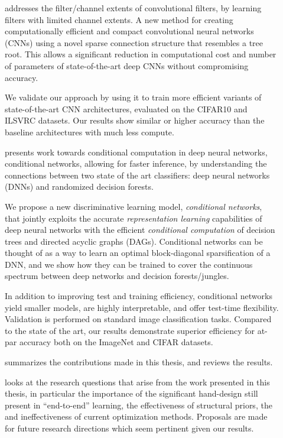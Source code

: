 \documentclass[thesis]{subfiles}
\begin{document}
\begin{description}
	\item[] addresses the filter/channel extents of convolutional filters, by learning filters with limited channel extents. A new method for creating computationally efficient and compact convolutional neural networks (CNNs) using a novel sparse connection structure that resembles a tree root. This allows a significant reduction in computational cost and number of parameters of state-of-the-art deep CNNs without compromising accuracy. 
	
	We validate our approach by using it to train more efficient variants of state-of-the-art CNN architectures, evaluated on the CIFAR10 and ILSVRC datasets. Our results show similar or higher accuracy than the baseline architectures with much less compute. %
	
	\item[] presents work towards conditional computation in deep neural networks, conditional networks, allowing for faster inference, by understanding the connections between two state of the art classifiers: deep neural networks (DNNs) and randomized decision forests.
	
	We propose a new discriminative learning model, \emph{conditional networks}, 
	that jointly exploits the accurate \emph{representation learning} capabilities of deep neural networks with the efficient \emph{conditional computation} of decision trees and directed acyclic graphs (DAGs).
	Conditional networks can be thought of as a way to learn an optimal block-diagonal sparsification of a DNN, and we show how they can be trained to cover the continuous spectrum between deep networks and decision forests/jungles. 
	
	In addition to improving test and training efficiency, conditional networks yield smaller models, are highly interpretable, and offer test-time flexibility. Validation is performed on standard image classification tasks. Compared to the state of the art, our results demonstrate superior efficiency for at-par accuracy both on the ImageNet and CIFAR datasets.
	
	\item[] summarizes the contributions made in this thesis, and reviews the results.
	
	\item[] looks at the research questions that arise from the work presented in this thesis, in particular the importance of the significant hand-design still present in ``end-to-end'' learning, the effectiveness of structural priors, the and ineffectiveness of current optimization methods. Proposals are made for future research directions which seem pertinent given our results.
	
\end{description}
\end{document}
